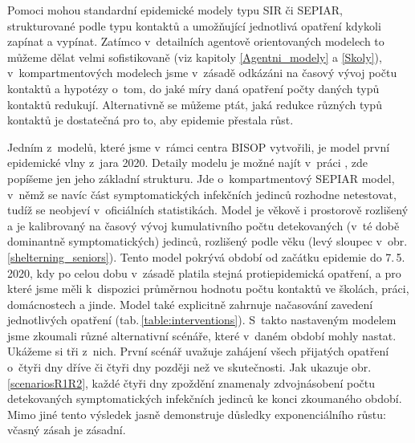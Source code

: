 Pomoci mohou standardní epidemické modely typu SIR či SEPIAR, strukturované podle typu kontaktů a umožňující jednotlivá opatření kdykoli zapínat a vypínat. Zatímco v~detailních agentově orientovaných modelech to můžeme dělat velmi sofistikovaně (viz kapitoly \ref{Agentni_modely} a \ref{Skoly}), v~kompartmentových modelech jsme v~zásadě odkázáni na časový vývoj počtu kontaktů a hypotézy o~tom, do jaké míry daná opatření počty daných typů kontaktů redukují. Alternativně se můžeme ptát, jaká redukce různých typů kontaktů je dostatečná pro to, aby epidemie přestala růst.   

Jedním z~modelů, které jsme v~rámci centra BISOP vytvořili, je model první epidemické vlny z~jara 2020. Detaily modelu je možné najít v~práci \cite{Berec_modelB}, zde popíšeme jen jeho základní strukturu. Jde o~kompartmentový SEPIAR model, v~němž se navíc část symptomatických infekčních jedinců rozhodne netestovat, tudíž se neobjeví v~oficiálních statistikách. Model je věkově i prostorově rozlišený a je kalibrovaný na časový vývoj kumulativního počtu detekovaných (v~té době dominantně symptomatických) jedinců, rozlišený podle věku (levý sloupec v~obr.\,\ref{shelterning_seniors}). Tento model pokrývá období od začátku epidemie do 7.\,5.\,2020, kdy po celou dobu v~zásadě platila stejná protiepidemická opatření, a pro které jsme měli k~dispozici průměrnou hodnotu počtu kontaktů ve školách, práci, domácnostech a jinde. Model také explicitně zahrnuje načasování zavedení jednotlivých opatření (tab.\,\ref{table:interventions}). S~takto nastaveným modelem jsme zkoumali různé alternativní scénáře, které v~daném období mohly nastat. Ukážeme si tři z~nich. První scénář uvažuje zahájení všech přijatých opatření o~čtyři dny dříve či čtyři dny později než ve skutečnosti. Jak ukazuje obr.\,\ref{scenariosR1R2}, každé čtyři dny zpoždění znamenaly zdvojnásobení počtu detekovaných symptomatických infekčních jedinců ke konci zkoumaného období. Mimo jiné tento výsledek jasně demonstruje důsledky exponenciálního růstu: včasný zásah je zásadní. 

